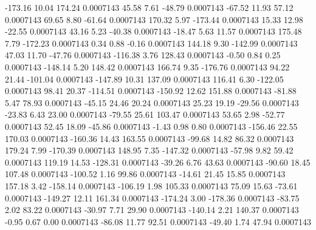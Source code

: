      -173.16       10.04      174.24     0.0007143
       45.58        7.61      -48.79     0.0007143
      -67.52       11.93       57.12     0.0007143
       69.65        8.80      -61.64     0.0007143
      170.32        5.97     -173.44     0.0007143
       15.33       12.98      -22.55     0.0007143
       43.16        5.23      -40.38     0.0007143
      -18.47        5.63       11.57     0.0007143
      175.48        7.79     -172.23     0.0007143
        0.34        0.88       -0.16     0.0007143
      144.18        9.30     -142.99     0.0007143
       47.03       11.70      -47.76     0.0007143
     -116.38        3.76      128.43     0.0007143
       -0.50        0.84        0.25     0.0007143
     -148.14        5.20      148.42     0.0007143
      166.74        9.35     -176.76     0.0007143
       94.22       21.44     -101.04     0.0007143
     -147.89       10.31      137.09     0.0007143
      116.41        6.30     -122.05     0.0007143
       98.41       20.37     -114.51     0.0007143
     -150.92       12.62      151.88     0.0007143
      -81.88        5.47       78.93     0.0007143
      -45.15       24.46       20.24     0.0007143
       25.23       19.19      -29.56     0.0007143
      -23.83        6.43       23.00     0.0007143
      -79.55       25.61      103.47     0.0007143
       53.65        2.98      -52.77     0.0007143
       52.45       18.09      -45.86     0.0007143
       -1.43        0.98        0.80     0.0007143
     -156.46       22.55      170.03     0.0007143
     -160.36       14.43      163.55     0.0007143
      -99.68       14.82       86.32     0.0007143
      179.24        7.99     -170.39     0.0007143
      148.95        7.35     -147.32     0.0007143
      -57.98        9.82       59.42     0.0007143
      119.19       14.53     -128.31     0.0007143
      -39.26        6.76       43.63     0.0007143
      -90.60       18.45      107.48     0.0007143
     -100.52        1.16       99.86     0.0007143
      -14.61       21.45       15.85     0.0007143
      157.18        3.42     -158.14     0.0007143
     -106.19        1.98      105.33     0.0007143
       75.09       15.63      -73.61     0.0007143
     -149.27       12.11      161.34     0.0007143
     -174.24        3.00     -178.36     0.0007143
      -83.75        2.02       83.22     0.0007143
      -30.97        7.71       29.90     0.0007143
     -140.14        2.21      140.37     0.0007143
       -0.95        0.67        0.00     0.0007143
      -86.08       11.77       92.51     0.0007143
      -49.40        1.74       47.94     0.0007143
